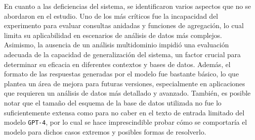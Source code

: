 En cuanto a las deficiencias del sistema, se identificaron varios aspectos que no se abordaron en el estudio. Uno de los más críticos fue la incapacidad del experimento para evaluar consultas anidadas y funciones de agregación, lo cual limita su aplicabilidad en escenarios de análisis de datos más complejos. Asimismo, la ausencia de un análisis multidominio impidió una evaluación adecuada de la capacidad de generalización del sistema, un factor crucial para determinar su eficacia en diferentes contextos y bases de datos. Además, el formato de las respuestas generadas por el modelo fue bastante básico, lo que plantea un área de mejora para futuras versiones, especialmente en aplicaciones que requieren un análisis de datos más detallado y avanzado. También, es posible notar que el tamaño del esquema de la base de datos utilizada no fue lo suficientemente extensa como para no caber en el texto de entrada limitado del modelo \texttt{GPT-4}, por lo cual se hace imprescindible probar cómo se comportaría el modelo para dichos casos extremos y posibles formas de resolverlo.

